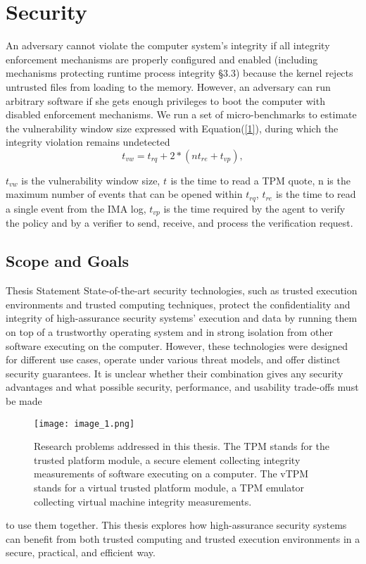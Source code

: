 \documentclass[11pt,twoside]{book}
\begin{document}
\tableofcontents
\newpage
\section{Security }
\raggedright An adversary cannot violate the computer system’s integrity if all integrity enforcement mechanisms are properly configured and enabled (including mechanisms protecting runtime process integrity §3.3) because the kernel rejects untrusted files from loading to the memory. However, an adversary can run arbitrary software if she gets enough privileges to boot the computer with disabled enforcement mechanisms. We run a set of micro-benchmarks to estimate the vulnerability window size expressed with Equation(\ref{1}), during which the integrity violation remains undetected
\begin{equation}
t_{vw}= t_{rq} + 2 * (nt_{re} + t_{vp}),\label{1}
\end{equation}
\raggedright $t_{vw}$  is the vulnerability window size, $t_{}$ is the time to read a TPM quote, n is the maximum number of events that can be opened within $t_{rq}$, $t_{re}$ is the time to read a single event from the IMA log, $t_{vp}$ is the time required by the agent to verify the policy and by a verifier to send, receive, and process the verification request.
\newline
\subsection{Scope and Goals}  

\raggedright Thesis Statement State-of-the-art security technologies, such as trusted execution environments and trusted computing techniques, protect the confidentiality and integrity of high-assurance security systems’ execution and data by running them on top of a trustworthy operating system and in strong isolation from other software executing on the computer. However, these technologies were designed for different use cases, operate under various threat models, and offer distinct security guarantees. It is unclear whether their combination gives any security advantages and what possible security, performance, and usability trade-offs must be made
\newline
\begin{figure}[h!]
    \centering
    \texttt{[image: image\_1.png]}
    \caption{Research problems addressed in this thesis. The TPM stands for the trusted platform module, a secure element collecting integrity measurements of software executing on a computer. The vTPM stands for a virtual trusted platform module, a TPM emulator collecting virtual machine integrity measurements.}
    \label{2}
\end{figure}
\raggedright to use them together. This thesis explores how high-assurance security systems can benefit from both trusted computing and trusted execution environments in a secure, practical, and efficient way.
\noindent
\end{document}
